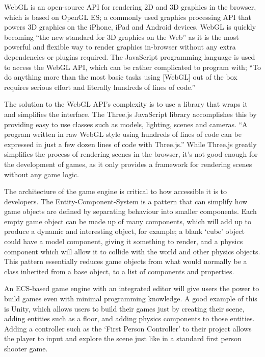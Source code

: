WebGL is an open-source API for rendering 2D and 3D graphics in the browser, which is based on OpenGL ES; a commonly used graphics processing API that powers 3D graphics on the iPhone, iPad and Android devices.\cite{parisi2012webgl} WebGL is quickly becoming ``the new standard for 3D graphics on the Web''\cite[p2]{parisi2012webgl} as it is the most powerful and flexible way to render graphics in-browser without any extra dependencies or plugins required. The JavaScript programming language is used to access the WebGL API, which can be rather complicated to program with; ``To do anything more than the most basic tasks using [WebGL] out of the box requires serious effort and literally hundreds of lines of code.''\cite[p44]{parisi2014programming}

The solution to the WebGL API's complexity is to use a library that wraps it and simplifies the interface. The Three.js\cite{threejs} JavaScript library accomplishes this by providing easy to use classes such as models, lighting, scenes and cameras. ``A program written in raw WebGL style using hundreds of lines of code can be expressed in just a few dozen lines of code with Three.js.''\cite[p57]{parisi2014programming} While Three.js greatly simplifies the process of rendering scenes in the browser, it's not good enough for the development of games, as it only provides a framework for rendering scenes without any game logic.

The architecture of the game engine is critical to how accessible it is to developers. The Entity-Component-System is a pattern that can simplify how game objects are defined by separating behaviour into smaller components. Each empty game object can be made up of many components, which will add up to produce a dynamic and interesting object, for example; a blank `cube' object could have a model component, giving it something to render, and a physics component which will allow it to collide with the world and other physics objects.\cite{gregory2014game} This pattern essentially reduces game objects from what would normally be a class inherited from a base object, to a list of components and properties.

An ECS-based game engine with an integrated editor will give users the power to build games even with minimal programming knowledge. A good example of this is Unity, which allows users to build their games just by creating their scene, adding entities such as a floor, and adding physics components to those entities.\cite{unitycreatingscenes} Adding a controller such as the `First Person Controller' to their project allows the player to input and explore the scene just like in a standard first person shooter game.\cite{unitycharactercontrol}

